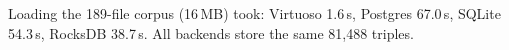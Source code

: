 Loading the 189-file corpus (16\,MB) took: Virtuoso 1.6\,s, Postgres 67.0\,s, SQLite 54.3\,s, RocksDB 38.7\,s. All backends store the same 81,488 triples.
